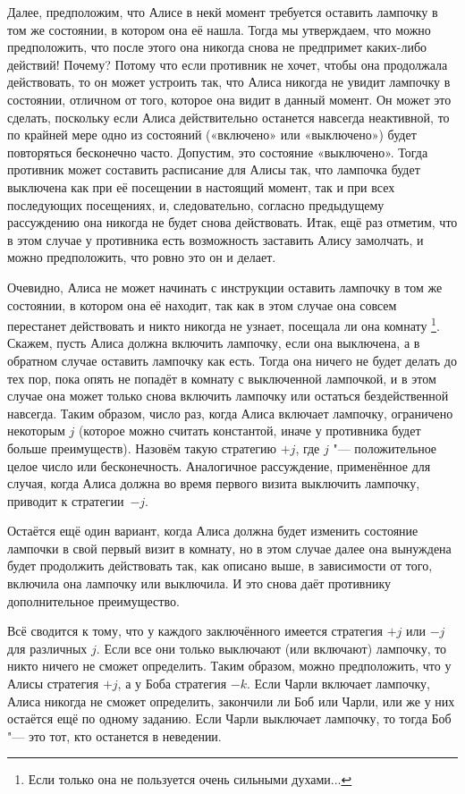\documentclass[twoside]{book}
\begin{document}
Далее, предположим, что Алисе в некй момент требуется оставить лампочку в том же состоянии, в котором она её нашла.
Тогда мы утверждаем, что можно предположить, что после этого она никогда снова не предпримет каких-либо действий!
Почему?
Потому что если противник не хочет, чтобы она продолжала действовать, то он может устроить так, что Алиса никогда не увидит лампочку в состоянии, отличном от того, которое она видит в данный момент.
Он может это сделать, поскольку если Алиса действительно останется навсегда неактивной, то по крайней мере одно из состояний («включено» или «выключено») будет повторяться бесконечно часто.
Допустим, это состояние «выключено».
Тогда противник может составить расписание для Алисы так, что лампочка будет выключена как при её посещении в настоящий момент, так и при всех последующих посещениях, и, следовательно, согласно предыдущему рассуждению она никогда не будет снова действовать.
Итак, ещё раз отметим, что в этом случае у противника есть возможность заставить Алису замолчать, и можно предположить, что ровно это он и делает.

Очевидно, Алиса не может начинать с инструкции оставить лампочку в том же состоянии, в котором она её находит, так как в этом случае она совсем перестанет действовать и никто никогда не узнает, посещала ли она комнату%
\footnote{Если только она не пользуется очень сильными духами...}.
Скажем, пусть Алиса должна включить лампочку, если она выключена, а в обратном случае оставить лампочку как есть.
Тогда она ничего не будет делать до тех пор, пока опять не попадёт в комнату с выключенной лампочкой, и в этом случае она может только снова включить лампочку или остаться бездейственной навсегда.
Таким образом, число раз, когда Алиса включает лампочку, ограничено некоторым $j$ (которое можно считать константой, иначе у противника будет больше преимуществ).
Назовём такую стратегию $+j$, где $j$ "--- положительное целое число или бесконечность.
Аналогичное рассуждение, применённое для случая, когда Алиса должна во время первого визита выключить лампочку, приводит к стратегии~$-j$.

Остаётся ещё один вариант, когда Алиса должна будет изменить состояние лампочки в свой первый визит в комнату, но в этом случае далее она вынуждена будет продолжить действовать так, как описано выше, в зависимости от того, включила она лампочку или выключила.
И это снова даёт противнику дополнительное преимущество.

Всё сводится к тому, что у каждого заключённого имеется стратегия $+j$ или $-j$ для различных $j$.
Если все они только выключают (или включают) лампочку, то никто ничего не сможет определить.
Таким образом, можно предположить, что у Алисы стратегия $+j$, а у Боба стратегия $-k$.
Если Чарли включает лампочку, Алиса никогда не сможет определить, закончили ли Боб или Чарли, или же у них остаётся ещё по одному заданию.
Если Чарли выключает лампочку, то тогда Боб "--- это тот, кто останется в неведении.
\end{document}
